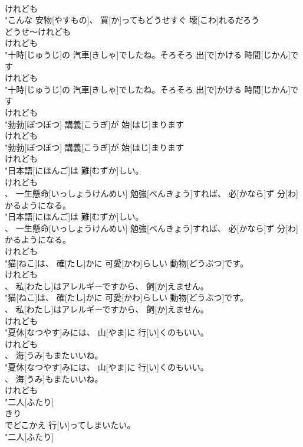 \documentclass[8pt]{extreport}
\begin{document}
\begin{CJK}{UTF8}{min}
\\	けれども
\\	"こんな 安物[やすもの]、 買[か]ってもどうせすぐ 壊[こわ]れるだろう
\\	どうせ～けれども	
\\	けれども
\\	"十時[じゅうじ]の 汽車[きしゃ]でしたね。そろそろ 出[で]かける 時間[じかん]です
\\	けれども
\\	"十時[じゅうじ]の 汽車[きしゃ]でしたね。そろそろ 出[で]かける 時間[じかん]です
\\	けれども
\\	"勃勃[ぼつぼつ] 講義[こうぎ]が 始[はじ]まります
\\	けれども
\\	"勃勃[ぼつぼつ] 講義[こうぎ]が 始[はじ]まります
\\	けれども
\\	"日本語[にほんご]は 難[むずか]しい。
\\	けれども
\\	、 一生懸命[いっしょうけんめい] 勉強[べんきょう]すれば、 必[かなら]ず 分[わ]かるようになる。
\\	"日本語[にほんご]は 難[むずか]しい。
\\	、 一生懸命[いっしょうけんめい] 勉強[べんきょう]すれば、 必[かなら]ず 分[わ]かるようになる。
\\	けれども
\\	"猫[ねこ]は、 確[たし]かに 可愛[かわ]らしい 動物[どうぶつ]です。
\\	けれども
\\	、 私[わたし]はアレルギーですから、 飼[か]えません。
\\	"猫[ねこ]は、 確[たし]かに 可愛[かわ]らしい 動物[どうぶつ]です。
\\	、 私[わたし]はアレルギーですから、 飼[か]えません。
\\	けれども
\\	"夏休[なつやす]みには、 山[やま]に 行[い]くのもいい。
\\	けれども
\\	、 海[うみ]もまたいいね。
\\	"夏休[なつやす]みには、 山[やま]に 行[い]くのもいい。
\\	、 海[うみ]もまたいいね。
\\	けれども
\\	"二人[ふたり]
\\	きり
\\	でどこかえ 行[い]ってしまいたい。
\\	"二人[ふたり]

\end{CJK}
\end{document}
